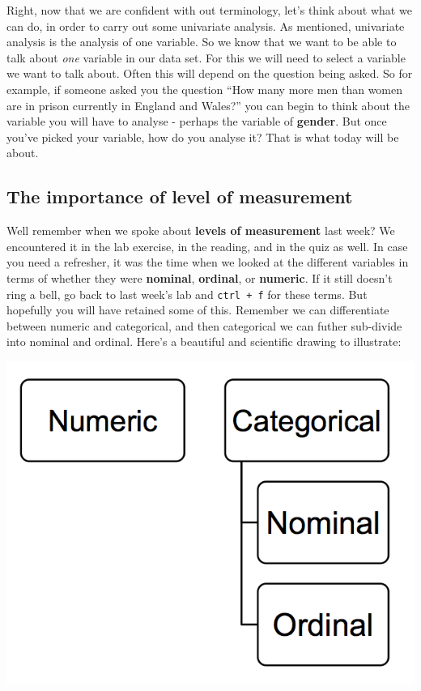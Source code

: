 \documentclass[]{book}
\theoremstyle{definition}
\theoremstyle{definition}
\theoremstyle{definition}
\theoremstyle{remark}
\begin{document}
Right, now that we are confident with out terminology, let's think about
what we can do, in order to carry out some univariate analysis. As
mentioned, univariate analysis is the analysis of one variable. So we
know that we want to be able to talk about \emph{one} variable in our
data set. For this we will need to select a variable we want to talk
about. Often this will depend on the question being asked. So for
example, if someone asked you the question ``How many more men than
women are in prison currently in England and Wales?'' you can begin to
think about the variable you will have to analyse - perhaps the variable
of \textbf{gender}. But once you've picked your variable, how do you
analyse it? That is what today will be about.

\hypertarget{the-importance-of-level-of-measurement}{%
\subsection{The importance of level of
measurement}\label{the-importance-of-level-of-measurement}}

Well remember when we spoke about \textbf{levels of measurement} last
week? We encountered it in the lab exercise, in the reading, and in the
quiz as well. In case you need a refresher, it was the time when we
looked at the different variables in terms of whether they were
\textbf{nominal}, \textbf{ordinal}, or \textbf{numeric}. If it still
doesn't ring a bell, go back to last week's lab and \texttt{ctrl\ +\ f}
for these terms. But hopefully you will have retained some of this.
Remember we can differentiate between numeric and categorical, and then
categorical we can futher sub-divide into nominal and ordinal. Here's a
beautiful and scientific drawing to illustrate:

\includegraphics{imgs/lvl_msr_diagr.png}
\end{document}
